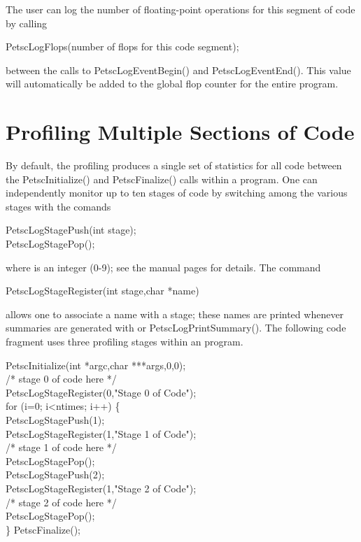 {{The user can log the number of floating-point operations 
for this segment of code by calling 
\begin{tabbing}
    PetscLogFlops(number of flops for this code segment);
\end{tabbing}
between the calls to PetscLogEventBegin() and PetscLogEventEnd().
This value will automatically be added to the global flop counter for the
entire program.

\section{Profiling Multiple Sections of Code}
\label{sec_profstages}

By default, the profiling produces a single set of statistics for all
code between the PetscInitialize() and PetscFinalize()
calls within a program.  One can independently monitor up to ten
stages of code by switching among the various stages with the comands
 
\begin{tabbing}
   PetscLogStagePush(int stage);\\
   PetscLogStagePop();
\end{tabbing}
where  is an integer (0-9); see the manual pages for details.
The command  
\begin{tabbing}
   PetscLogStageRegister(int stage,char *name)
\end{tabbing}
allows one to associate a name with a stage; these names are printed whenever
summaries are generated with  or PetscLogPrintSummary().
The following code fragment uses three profiling stages within an program.

\begin{tabbing}
   PetscInitialize(int *argc,char ***args,0,0);\\
   /* stage 0 of code here */\\
   PetscLogStageRegister(0,"Stage 0 of Code");\\
   for (i=0; i<ntimes; i++) \{\\
      PetscLogStagePush(1);\\
      PetscLogStageRegister(1,"Stage 1 of Code");\\
      /* stage 1 of code here */\\
      PetscLogStagePop();\\
      PetscLogStagePush(2);\\
      PetscLogStageRegister(1,"Stage 2 of Code");\\
      /* stage 2 of code here */\\
      PetscLogStagePop();\\
   \}
   PetscFinalize();
\end{tabbing}

}}
